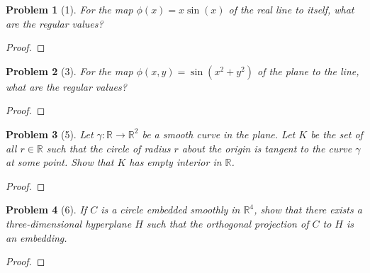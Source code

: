 \documentclass[10pt]{article}
\newcommand{\sk}{\vskip 10mm}
\newcommand{\bb}[1]{\mathbb{#1}}
\theoremstyle{plain}
\newtheorem{problem}{Problem}
\theoremstyle{remark}
\begin{document}
\begin{problem}[1]
  For the map $\phi(x)=x\sin(x)$ of the real line to itself,
  what are the regular values?
\end{problem}

\begin{proof}
  
\end{proof}

\sk

\begin{problem}[3]
  For the map $\phi(x,y)=\sin(x^2+y^2)$ of the plane to the line,
  what are the regular values?
\end{problem}

\begin{proof}
  
\end{proof}

\sk

\begin{problem}[5]
  Let $\gamma:\bb{R}\rightarrow\bb{R}^2$ be a smooth curve in the plane.
  Let $K$ be the set of all $r\in \bb{R}$ such that the circle of
  radius $r$ about the origin is tangent to the curve $\gamma$ at
  some point. Show that $K$ has empty interior in $\bb{R}$.
\end{problem}

\begin{proof}
  
\end{proof}

\sk

\begin{problem}[6]
  If $C$ is a circle embedded smoothly in $\bb{R}^4$, show that
  there exists a three-dimensional hyperplane $H$ such that the
  orthogonal projection of $C$ to $H$ is an embedding.
\end{problem}

\begin{proof}
  
\end{proof}

\sk

\end{document}
